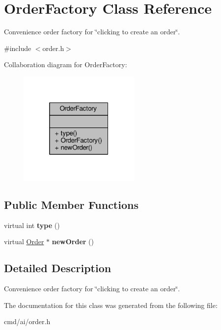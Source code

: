 \hypertarget{classOrderFactory}{}\section{Order\+Factory Class Reference}
\label{classOrderFactory}


Convenience order factory for \char`\"{}clicking to create an order\char`\"{}.  




{\ttfamily \#include $<$order.\+h$>$}



Collaboration diagram for Order\+Factory\+:
\nopagebreak
\begin{figure}[H]
\begin{center}
\leavevmode
\includegraphics[width=169pt]{de/dfd/classOrderFactory__coll__graph}
\end{center}
\end{figure}
\subsection*{Public Member Functions}
\begin{DoxyCompactItemize}
\item 
virtual int {\bfseries type} ()\hypertarget{classOrderFactory_a1a2bc590c47d4dfae19440903e70e1dc}{}\label{classOrderFactory_a1a2bc590c47d4dfae19440903e70e1dc}

\item 
virtual \hyperlink{classOrder}{Order} $\ast$ {\bfseries new\+Order} ()\hypertarget{classOrderFactory_aef81780954d3deab6149001c7501e5bc}{}\label{classOrderFactory_aef81780954d3deab6149001c7501e5bc}

\end{DoxyCompactItemize}


\subsection{Detailed Description}
Convenience order factory for \char`\"{}clicking to create an order\char`\"{}. 

The documentation for this class was generated from the following file\+:\begin{DoxyCompactItemize}
\item 
cmd/ai/order.\+h\end{DoxyCompactItemize}

